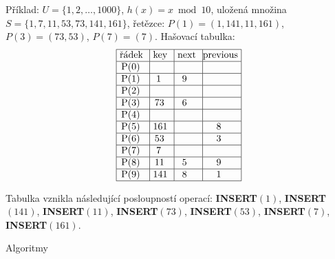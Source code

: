 \documentclass[a4paper,12pt]{article}
\begin{document}
Příklad: $U=\{1,2,\dots,1000\}$, $h(x)=x\bmod10$,\newline 
uložená množina $S=\{1,7,11,53,73,141,161\}$,\newline 
řetězce: $P(1)=(1,141,11,161)$, 
$P(3)=(73,53)$, $P(7)=(7)$.\newline 
Hašovací tabulka:
$$\vtop{\offinterlineskip\halign {\strut\vrule\ # & \vrule\ # & \vrule\ # & \vrule \hfil # \hfil \vrule\cr\noalign{\hrule}řádek & key & next & previous\hfil \cr\noalign{\hrule}P(0) & & & \hfill \cr\noalign{\hrule}P(1) & 1 & 9 & \hfill \cr\noalign{\hrule}P(2) & & & \hfill \cr\noalign{\hrule}P(3) & 73 & 6 & \hfill \cr\noalign{\hrule}P(4) & & &\hfill \cr\noalign{\hrule}P(5) & 161 & & 8 \cr\noalign{\hrule}P(6) & 53 & & 3 \cr\noalign{\hrule}P(7) & 7 & &\hfill \cr\noalign{\hrule}P(8) & 11 & 5 & 9 \cr\noalign{\hrule}P(9) & 141 & 8 & 1 \cr\noalign{\hrule}}}$$

Tabulka vznikla následující posloupností 
operací:\newline 
{\bf INSERT$(1)$}, {\bf INSERT$(141)$}, {\bf INSERT$(11)$}, {\bf INSERT$
(73)$}, 
{\bf INSERT$(53)$},\newline 
{\bf INSERT$(7)$}, {\bf INSERT$(161)$}. 

\subhead
Algoritmy
\endsubhead
\end{document}
